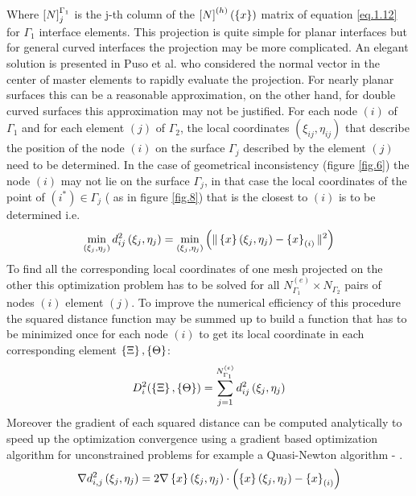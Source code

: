      Where $\left[{N}\right]_{j}^{\Gamma_1}$ is the j-th column of the $\left[{N}\right]^{(h)}(\left\lbrace{x}\right \rbrace)$ matrix of equation \eqref{eq.1.12} for ${\Gamma_1}$ interface elements. This projection is quite simple for planar interfaces but for general curved interfaces the projection may be more complicated. An elegant solution is presented in Puso et al. \cite{puso20043d} who considered the normal vector in the center of master elements to rapidly evaluate the projection. For nearly planar surfaces this can be a reasonable approximation, on the other hand, for double curved surfaces this approximation may not be justified.
     For each node $(i)$ of $\Gamma_1$ and for each element $(j)$ of $\Gamma_2$, the local coordinates $(\xi_{ij},\eta_{ij})$ that describe the position of the node $(i)$ on the surface $\Gamma_j$ described by the element $(j)$ need to be determined. In the case of geometrical inconsistency (figure \ref{fig.6}) the node $(i)$ may not lie on the surface $\Gamma_j$, in that case the local coordinates of the point of $(i^*) \in \Gamma_j$ ( as in figure \ref{fig.8}) that is the closest to $(i)$ is to be determined i.e.
     \begin{equation}
     \label{eq.43}
     \min_{\left(\xi_{j},\eta_{j}\right)}d^2_{ij}\left(\xi_{j},\eta_{j}\right)=\min_{\left(\xi_{j},\eta_{j}\right)}\left( \|\left\lbrace{x}\right \rbrace\left(\xi_{j},\eta_{j}\right)-\left\lbrace{x}\right \rbrace_{(i)} \|^2\right)
     \end{equation}
     To find all the corresponding local coordinates of one mesh projected on the other this optimization problem has to be solved for all $N^{(e)}_{\Gamma_1}\times N_{\Gamma_2}$ pairs of nodes $(i)$ element $(j)$. To improve the numerical efficiency of this procedure the squared distance function may be summed up to build a function that has to be minimized once for each node $(i)$ to get its local coordinate in each corresponding element $\left\lbrace{\Xi}\right \rbrace,\left\lbrace{\Theta}\right \rbrace$:
     \begin{equation}
     \label{eq.44}
     D_{i}^2(\left\lbrace{\Xi}\right \rbrace,\left\lbrace{\Theta}\right \rbrace)=\sum_{j=1}^{N^{(e)}_{\Gamma_1}}d^2_{ij}\left(\xi_{j},\eta_{j}\right)
     \end{equation}
     Moreover the gradient of each squared distance can be computed analytically to speed up the optimization convergence using a gradient based optimization algorithm for unconstrained problems for example a Quasi-Newton algorithm \cite{dennis1977quasi,davidon1959aec}- \cite{fletcher1963rapidly,dennis1996numerical}.
     \begin{equation}
     \label{eq.45}
     \nabla d_{i,j}^2 \left(\xi_{j},\eta_{j}\right)=2\nabla\left\lbrace{x}\right \rbrace\left(\xi_{j},\eta_{j}\right)\cdot\left( \left\lbrace{x}\right \rbrace\left(\xi_{j},\eta_{j}\right)-\left\lbrace{x}\right \rbrace_{(i)}\right)
     \end{equation}
